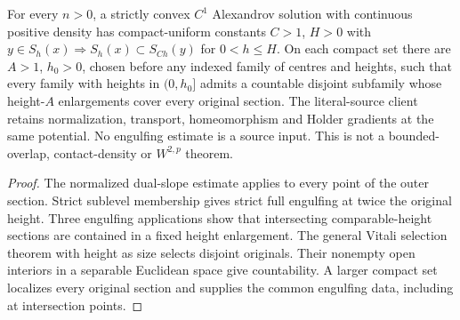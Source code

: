 \begin{lemma}
  \label{lem:convex-section-covering}
  \leanok
  For every $n>0$, a strictly convex $C^1$ Alexandrov solution with continuous positive
  density has compact-uniform constants $C>1$, $H>0$ with
  $y\in S_h(x)\Rightarrow S_h(x)\subset S_{Ch}(y)$ for $0<h\le H$.
  On each compact set there are $A>1$, $h_0>0$, chosen before any indexed family of
  centres and heights, such that every family with heights in $(0,h_0]$ admits a
  countable disjoint subfamily whose height-$A$ enlargements cover every original
  section. The literal-source client retains normalization, transport, homeomorphism
  and Holder gradients at the same potential. No engulfing estimate is a source input.
  This is not a bounded-overlap, contact-density or $W^{2,p}$ theorem.
\end{lemma}
\begin{proof}
  \leanok
  The normalized dual-slope estimate applies to every point of the outer section.
  Strict sublevel membership gives strict full engulfing at twice the original height.
  Three engulfing applications show that intersecting comparable-height sections are
  contained in a fixed height enlargement. The general Vitali selection theorem with
  height as size selects disjoint originals. Their nonempty open interiors in a
  separable Euclidean space give countability. A larger compact set localizes every
  original section and supplies the common engulfing data, including at intersection points.
\end{proof}


